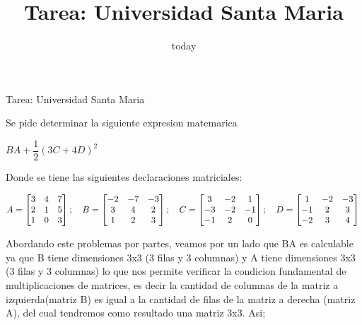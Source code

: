 \documentclass[a4paper,12pt]{article}
\title{Tarea: Universidad Santa Maria}
\date{today}
\begin{document}
\begin{center}
Tarea: Universidad Santa Maria
\end{center}

Se pide determinar la siguiente expresion matemarica

\begin{center}
$BA + \dfrac{1}{2}(3C + 4D)^2$
\end{center}

Donde se tiene las siguientes declaraciones matriciales:

$\\ A = \left [ \begin{matrix}
	3 & 4 & 7\\
	2 & 1 & 5\\
	1 & 0 & 3\\
\end{matrix}\right ]
;~~~B = \left [ \begin{matrix}
	-2 & -7 & -3\\
	 3 &  4 &  2\\
	 1 &  2 &  3\\
\end{matrix}\right ]
;~~~C = \left [ \begin{matrix}
	 3 & -2 &  1\\
	-3 & -2 & -1\\
	-1 &  2 &  0\\
\end{matrix}\right ]
;~~~D = \left [ \begin{matrix}
	 1 & -2 & -3\\
	-1 &  2 &  3\\
	-2 &  3 &  4\\
\end{matrix}\right ] 
\\\\\\
$ 

Abordando este problemas por partes, veamos por un lado que BA es calculable ya que B tiene dimensiones 3x3 (3 filas y 3 columnas) y A tiene dimensiones 3x3 (3 filas y 3 columnas) lo que nos permite verificar la condicion fundamental de multiplicaciones de matrices, es decir la cantidad de columnas de la matriz a izquierda(matriz B) es igual a la cantidad de filas de la matriz a derecha (matriz A), del cual tendremos como resultado una matriz 3x3. Asi;
\end{document}
